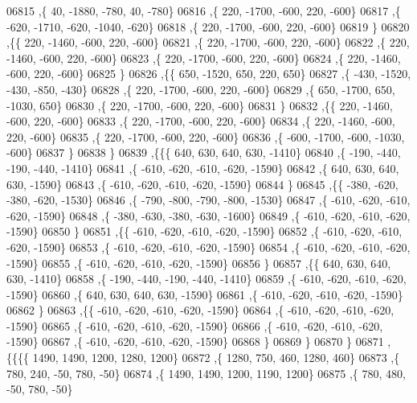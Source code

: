 \begin{DoxyCode}
06815     ,\{    40, -1880,  -780,    40,  -780\}
06816     ,\{   220, -1700,  -600,   220,  -600\}
06817     ,\{  -620, -1710,  -620, -1040,  -620\}
06818     ,\{   220, -1700,  -600,   220,  -600\}
06819     \}
06820    ,\{\{   220, -1460,  -600,   220,  -600\}
06821     ,\{   220, -1700,  -600,   220,  -600\}
06822     ,\{   220, -1460,  -600,   220,  -600\}
06823     ,\{   220, -1700,  -600,   220,  -600\}
06824     ,\{   220, -1460,  -600,   220,  -600\}
06825     \}
06826    ,\{\{   650, -1520,   650,   220,   650\}
06827     ,\{  -430, -1520,  -430,  -850,  -430\}
06828     ,\{   220, -1700,  -600,   220,  -600\}
06829     ,\{   650, -1700,   650, -1030,   650\}
06830     ,\{   220, -1700,  -600,   220,  -600\}
06831     \}
06832    ,\{\{   220, -1460,  -600,   220,  -600\}
06833     ,\{   220, -1700,  -600,   220,  -600\}
06834     ,\{   220, -1460,  -600,   220,  -600\}
06835     ,\{   220, -1700,  -600,   220,  -600\}
06836     ,\{  -600, -1700,  -600, -1030,  -600\}
06837     \}
06838    \}
06839   ,\{\{\{   640,   630,   640,   630, -1410\}
06840     ,\{  -190,  -440,  -190,  -440, -1410\}
06841     ,\{  -610,  -620,  -610,  -620, -1590\}
06842     ,\{   640,   630,   640,   630, -1590\}
06843     ,\{  -610,  -620,  -610,  -620, -1590\}
06844     \}
06845    ,\{\{  -380,  -620,  -380,  -620, -1530\}
06846     ,\{  -790,  -800,  -790,  -800, -1530\}
06847     ,\{  -610,  -620,  -610,  -620, -1590\}
06848     ,\{  -380,  -630,  -380,  -630, -1600\}
06849     ,\{  -610,  -620,  -610,  -620, -1590\}
06850     \}
06851    ,\{\{  -610,  -620,  -610,  -620, -1590\}
06852     ,\{  -610,  -620,  -610,  -620, -1590\}
06853     ,\{  -610,  -620,  -610,  -620, -1590\}
06854     ,\{  -610,  -620,  -610,  -620, -1590\}
06855     ,\{  -610,  -620,  -610,  -620, -1590\}
06856     \}
06857    ,\{\{   640,   630,   640,   630, -1410\}
06858     ,\{  -190,  -440,  -190,  -440, -1410\}
06859     ,\{  -610,  -620,  -610,  -620, -1590\}
06860     ,\{   640,   630,   640,   630, -1590\}
06861     ,\{  -610,  -620,  -610,  -620, -1590\}
06862     \}
06863    ,\{\{  -610,  -620,  -610,  -620, -1590\}
06864     ,\{  -610,  -620,  -610,  -620, -1590\}
06865     ,\{  -610,  -620,  -610,  -620, -1590\}
06866     ,\{  -610,  -620,  -610,  -620, -1590\}
06867     ,\{  -610,  -620,  -610,  -620, -1590\}
06868     \}
06869    \}
06870   \}
06871  ,\{\{\{\{  1490,  1490,  1200,  1280,  1200\}
06872     ,\{  1280,   750,   460,  1280,   460\}
06873     ,\{   780,   240,   -50,   780,   -50\}
06874     ,\{  1490,  1490,  1200,  1190,  1200\}
06875     ,\{   780,   480,   -50,   780,   -50\}

\end{DoxyCode}
